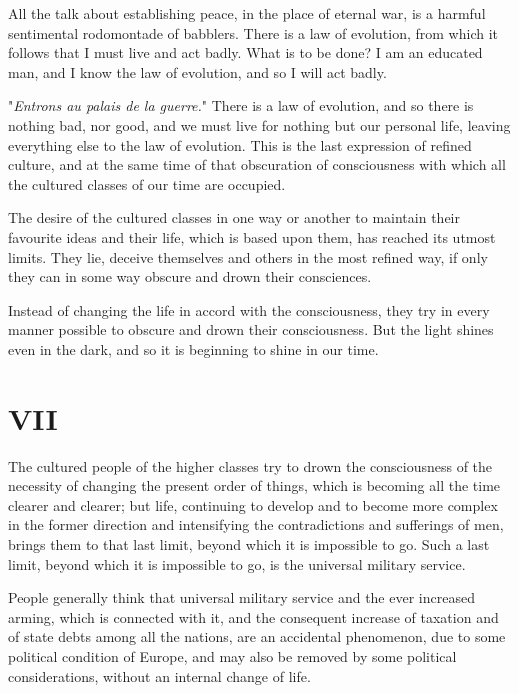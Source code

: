 \documentclass{book}
\begin{document}
All the talk about establishing peace, in the place of eternal war, is a harmful sentimental rodomontade of babblers. There is a law of evolution, from which it follows that I must live and act badly. What is to be done? I am an educated man, and I know the law of evolution, and so I will act badly.

"\emph{Entrons au palais de la guerre.}" There is a law of evolution, and so there is nothing bad, nor good, and we must live for nothing but our personal life, leaving everything else to the law of evolution. This is the last expression of refined culture, and at the same time of that obscuration of consciousness with which all the cultured classes of our time are occupied.

The desire of the cultured classes in one way or another to maintain their favourite ideas and their life, which is based upon them, has reached its utmost limits. They lie, deceive themselves and others in the most refined way, if only they can in some way obscure and drown their consciences.

Instead of changing the life in accord with the consciousness, they try in every manner possible to obscure and drown their consciousness. But the light shines even in the dark, and so it is beginning to shine in our time.

\chapter*{VII}
\label{chapter-7}
The cultured people of the higher classes try to drown the consciousness of the necessity of changing the present order of things, which is becoming all the time clearer and clearer; but life, continuing to develop and to become more complex in the former direction and intensifying the contradictions and sufferings of men, brings them to that last limit, beyond which it is impossible to go. Such a last limit, beyond which it is impossible to go, is the universal military service.

People generally think that universal military service and the ever increased arming, which is connected with it, and the consequent increase of taxation and of state debts among all the nations, are an accidental phenomenon, due to some political condition of Europe, and may also be removed by some political considerations, without an internal change of life.
\end{document}
